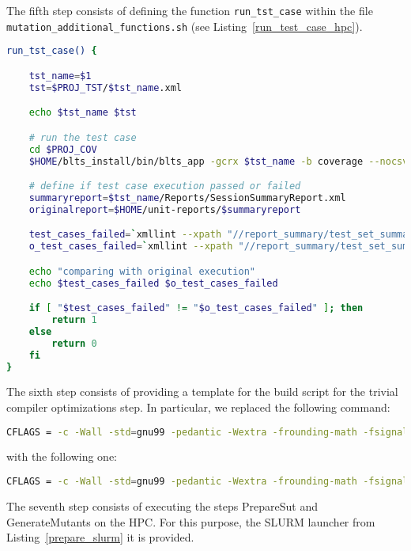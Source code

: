 The fifth step consists of defining the function \texttt{run\_tst\_case} within the file \\\texttt{mutation\_additional\_functions.sh} (see Listing~\ref{run_test_case_hpc}).

\begin{lstlisting}[language=bash, label=run_test_case_hpc ,caption=Implementation of the run test case Bash function for the MLFS.]
run_tst_case() {

    tst_name=$1
    tst=$PROJ_TST/$tst_name.xml

    echo $tst_name $tst

    # run the test case
    cd $PROJ_COV
    $HOME/blts_install/bin/blts_app -gcrx $tst_name -b coverage --nocsv -s $tst

    # define if test case execution passed or failed
    summaryreport=$tst_name/Reports/SessionSummaryReport.xml
    originalreport=$HOME/unit-reports/$summaryreport

    test_cases_failed=`xmllint --xpath "//report_summary/test_set_summary/test_cases_failed/text()" $summaryreport`
    o_test_cases_failed=`xmllint --xpath "//report_summary/test_set_summary/test_cases_failed/text()" $originalreport`

    echo "comparing with original execution"
    echo $test_cases_failed $o_test_cases_failed

    if [ "$test_cases_failed" != "$o_test_cases_failed" ]; then
        return 1
    else
        return 0
    fi
}
\end{lstlisting}

The sixth step consists of providing a template for the build script for the trivial compiler optimizations step. In particular, we replaced the following command:

\begin{lstlisting}[language=bash]
CFLAGS = -c -Wall -std=gnu99 -pedantic -Wextra -frounding-math -fsignaling-nans -g O2 -fno-builtin $(EXTRA_CFLAGS)
\end{lstlisting}

with the following one:

\begin{lstlisting}[language=bash]
CFLAGS = -c -Wall -std=gnu99 -pedantic -Wextra -frounding-math -fsignaling-nans TCE -fno-builtin $(EXTRA_CFLAGS)
\end{lstlisting}

The seventh step consists of executing the steps PrepareSut and GenerateMutants on the HPC. For this purpose, the SLURM launcher from Listing~\ref{prepare_slurm} it is provided.

